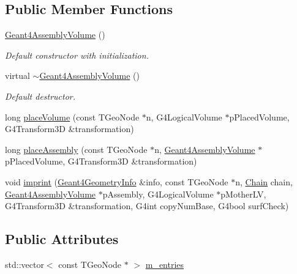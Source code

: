 \subsection*{Public Member Functions}
\begin{DoxyCompactItemize}
\item 
\hyperlink{class_d_d4hep_1_1_simulation_1_1_geant4_assembly_volume_a140dd17a22b41606681a2494737ed02a}{Geant4\+Assembly\+Volume} ()
\begin{DoxyCompactList}\small\item\em Default constructor with initialization. \end{DoxyCompactList}\item 
virtual \hyperlink{class_d_d4hep_1_1_simulation_1_1_geant4_assembly_volume_a62b2a9ebf445a8482edbe01918d55243}{$\sim$\+Geant4\+Assembly\+Volume} ()
\begin{DoxyCompactList}\small\item\em Default destructor. \end{DoxyCompactList}\item 
long \hyperlink{class_d_d4hep_1_1_simulation_1_1_geant4_assembly_volume_a7ab45077a09ab1397f437b167b097c94}{place\+Volume} (const T\+Geo\+Node $\ast$n, G4\+Logical\+Volume $\ast$p\+Placed\+Volume, G4\+Transform3D \&transformation)
\item 
long \hyperlink{class_d_d4hep_1_1_simulation_1_1_geant4_assembly_volume_adde18f645695f14e3ae08d7fed2451c1}{place\+Assembly} (const T\+Geo\+Node $\ast$n, \hyperlink{class_d_d4hep_1_1_simulation_1_1_geant4_assembly_volume}{Geant4\+Assembly\+Volume} $\ast$p\+Placed\+Volume, G4\+Transform3D \&transformation)
\item 
void \hyperlink{class_d_d4hep_1_1_simulation_1_1_geant4_assembly_volume_a5f445612042e1ff7a273e1c2fdb5111b}{imprint} (\hyperlink{class_d_d4hep_1_1_simulation_1_1_geant4_geometry_info}{Geant4\+Geometry\+Info} \&info, const T\+Geo\+Node $\ast$n, \hyperlink{class_d_d4hep_1_1_simulation_1_1_geant4_assembly_volume_ad79481b292635c219fcc03d160689211}{Chain} chain, \hyperlink{class_d_d4hep_1_1_simulation_1_1_geant4_assembly_volume}{Geant4\+Assembly\+Volume} $\ast$p\+Assembly, G4\+Logical\+Volume $\ast$p\+Mother\+LV, G4\+Transform3D \&transformation, G4int copy\+Num\+Base, G4bool surf\+Check)
\end{DoxyCompactItemize}
\subsection*{Public Attributes}
\begin{DoxyCompactItemize}
\item 
std\+::vector$<$ const T\+Geo\+Node $\ast$ $>$ \hyperlink{class_d_d4hep_1_1_simulation_1_1_geant4_assembly_volume_a0d910d90aa651bf5ccb3816c5ce3641a}{m\+\_\+entries}
\end{DoxyCompactItemize}


